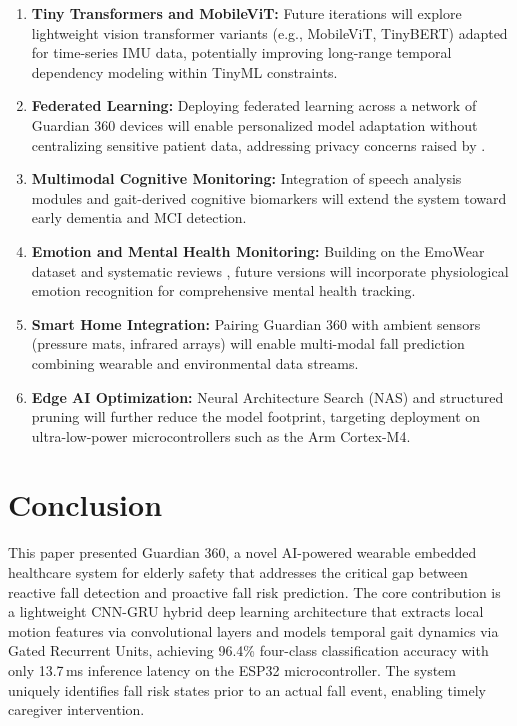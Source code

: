\documentclass[conference]{IEEEtran}
\begin{document}
\begin{enumerate}
  \item \textbf{Tiny Transformers and MobileViT:} Future iterations will explore lightweight vision transformer variants (e.g., MobileViT, TinyBERT) adapted for time-series IMU data, potentially improving long-range temporal dependency modeling within TinyML constraints.
  \item \textbf{Federated Learning:} Deploying federated learning across a network of Guardian 360 devices will enable personalized model adaptation without centralizing sensitive patient data, addressing privacy concerns raised by \cite{khalil2026}.
  \item \textbf{Multimodal Cognitive Monitoring:} Integration of speech analysis modules \cite{huang2024, ambrosini2019} and gait-derived cognitive biomarkers \cite{tsiakiri2025} will extend the system toward early dementia and MCI detection.
  \item \textbf{Emotion and Mental Health Monitoring:} Building on the EmoWear dataset \cite{rahmani2024} and systematic reviews \cite{vogka2025}, future versions will incorporate physiological emotion recognition for comprehensive mental health tracking.
  \item \textbf{Smart Home Integration:} Pairing Guardian 360 with ambient sensors (pressure mats, infrared arrays) will enable multi-modal fall prediction combining wearable and environmental data streams.
  \item \textbf{Edge AI Optimization:} Neural Architecture Search (NAS) and structured pruning will further reduce the model footprint, targeting deployment on ultra-low-power microcontrollers such as the Arm Cortex-M4.
\end{enumerate}

\section{Conclusion}

This paper presented Guardian 360, a novel AI-powered wearable embedded healthcare system for elderly safety that addresses the critical gap between reactive fall detection and proactive fall risk prediction. The core contribution is a lightweight CNN-GRU hybrid deep learning architecture that extracts local motion features via convolutional layers and models temporal gait dynamics via Gated Recurrent Units, achieving 96.4\% four-class classification accuracy with only 13.7\,ms inference latency on the ESP32 microcontroller. The system uniquely identifies fall risk states prior to an actual fall event, enabling timely caregiver intervention.
\end{document}

